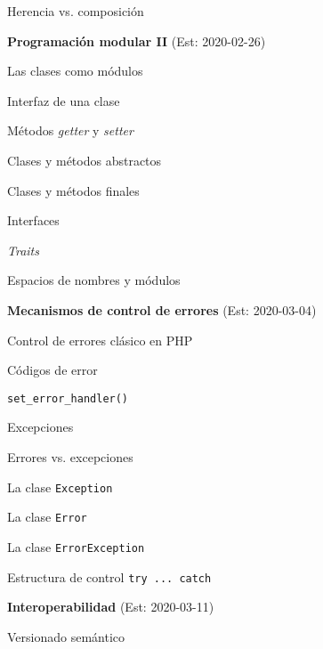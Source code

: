 \begin{longenum}
\begin{longenum}
        \item Herencia vs. composición
    \end{longenum}
    \item \textbf{Programación modular II}  (Est: 2020-02-26)
    \begin{longenum}
        \item Las clases como módulos
        \begin{longenum}
            \item Interfaz de una clase
            \item Métodos \textit{getter} y \textit{setter}
        \end{longenum}
        \item Clases y métodos abstractos
        \item Clases y métodos finales
        \item Interfaces
        \item \textit{Traits}
        \item Espacios de nombres y módulos
    \end{longenum}
    \item \textbf{Mecanismos de control de errores}  (Est: 2020-03-04)
    \begin{longenum}
        \item Control de errores clásico en PHP
        \begin{longenum}
            \item Códigos de error
            \item \texttt{set\_error\_handler()}
        \end{longenum}
        \item Excepciones
        \begin{longenum}
            \item Errores vs. excepciones
            \item La clase \texttt{Exception}
            \item La clase \texttt{Error}
            \item La clase \texttt{ErrorException}
            \item Estructura de control \texttt{try ... catch}
        \end{longenum}
    \end{longenum}
    \item \textbf{Interoperabilidad}  (Est: 2020-03-11)
    \begin{longenum}
        \item Versionado semántico

\end{longenum}
\end{longenum}
